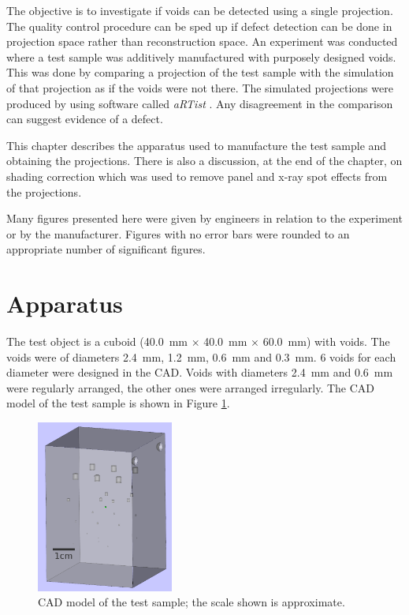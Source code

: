 The objective is to investigate if voids can be detected using a single projection. The quality control procedure can be sped up if defect detection can be done in projection space rather than reconstruction space. An experiment was conducted where a test sample was additively manufactured with purposely designed voids. This was done by comparing a projection of the test sample with the simulation of that projection as if the voids were not there. The simulated projections were produced by using software called \emph{aRTist} \citep{bellon2007artist, jaenisch2008artist, bellon2012radiographic}. Any disagreement in the comparison can suggest evidence of a defect.

This chapter describes the apparatus used to manufacture the test sample and obtaining the projections. There is also a discussion, at the end of the chapter, on shading correction which was used to remove panel and x-ray spot effects from the projections.

Many figures presented here were given by engineers in relation to the experiment or by the manufacturer. Figures with no error bars were rounded to an appropriate number of significant figures.

\section{Apparatus}

The test object is a cuboid (\SI{40.0}{\milli\metre} $\times$ \SI{40.0}{\milli\metre} $\times$ \SI{60.0}{\milli\metre}) with voids. The voids were of diameters \SI{2.4}{\milli\metre}, \SI{1.2}{\milli\metre}, \SI{0.6}{\milli\metre} and \SI{0.3}{\milli\metre}. 6 voids for each diameter were designed in the CAD. Voids with diameters \SI{2.4}{\milli\metre} and \SI{0.6}{\milli\metre} were regularly arranged, the other ones were arranged irregularly. The CAD model of the test sample is shown in Figure \ref{fig:inference_testObject}.

\begin{figure}
  \centering
  \includegraphics[width=0.4\textwidth]{../figures/inference/TestObject.png}
  \caption{CAD model of the test sample; the scale shown is approximate.}
  \label{fig:inference_testObject}
\end{figure}

